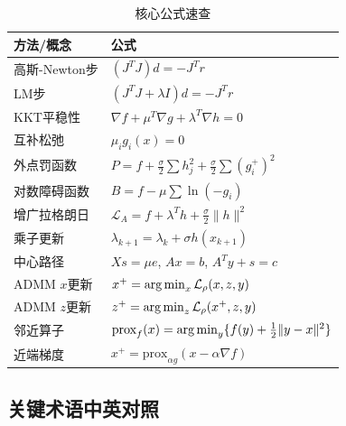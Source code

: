 \begin{table}[htbp]
\centering
\caption{核心公式速查}
\begin{tabular}{@{}ll@{}}
\toprule
\textbf{方法/概念} & \textbf{公式} \\
\midrule
高斯-Newton步 & $(J^T J) d = -J^T r$ \\
LM步 & $(J^T J + \lambda I) d = -J^T r$ \\
KKT平稳性 & $\nabla f + \mu^T \nabla g + \lambda^T \nabla h = 0$ \\
互补松弛 & $\mu_i g_i(x) = 0$ \\
外点罚函数 & $P = f + \frac{\sigma}{2}\sum h_j^2 + \frac{\sigma}{2}\sum (g_i^+)^2$ \\
对数障碍函数 & $B = f - \mu\sum \ln(-g_i)$ \\
增广拉格朗日 & $\mathcal{L}_A = f + \lambda^T h + \frac{\sigma}{2}\|h\|^2$ \\
乘子更新 & $\lambda_{k+1} = \lambda_k + \sigma h(x_{k+1})$ \\
中心路径 & $Xs = \mu e$, $Ax = b$, $A^T y + s = c$ \\
ADMM $x$更新 & $x^+ = \operatorname{arg\,min}_x \mathcal{L}_\rho(x, z, y)$ \\
ADMM $z$更新 & $z^+ = \operatorname{arg\,min}_z \mathcal{L}_\rho(x^+, z, y)$ \\
邻近算子 & $\text{prox}_f(x) = \operatorname{arg\,min}_y\{f(y) + \frac{1}{2}\|y-x\|^2\}$ \\
近端梯度 & $x^+ = \text{prox}_{\alpha g}(x - \alpha \nabla f)$ \\
\bottomrule
\end{tabular}
\end{table}

\subsection{关键术语中英对照}

